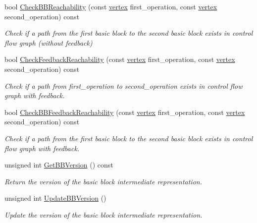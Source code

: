 \begin{DoxyCompactItemize}
bool \hyperlink{classFunctionBehavior_aa2a720e2f8f4f6d7d3240bbc13f758e9}{Check\+B\+B\+Reachability} (const \hyperlink{graph_8hpp_abefdcf0544e601805af44eca032cca14}{vertex} first\+\_\+operation, const \hyperlink{graph_8hpp_abefdcf0544e601805af44eca032cca14}{vertex} second\+\_\+operation) const
\begin{DoxyCompactList}\small\item\em Check if a path from the first basic block to the second basic block exists in control flow graph (without feedback) \end{DoxyCompactList}\item 
bool \hyperlink{classFunctionBehavior_a5aa434e53a5779c8f64fc8acdaa86bf1}{Check\+Feedback\+Reachability} (const \hyperlink{graph_8hpp_abefdcf0544e601805af44eca032cca14}{vertex} first\+\_\+operation, const \hyperlink{graph_8hpp_abefdcf0544e601805af44eca032cca14}{vertex} second\+\_\+operation) const
\begin{DoxyCompactList}\small\item\em Check if a path from first\+\_\+operation to second\+\_\+operation exists in control flow graph with feedback. \end{DoxyCompactList}\item 
bool \hyperlink{classFunctionBehavior_af24a99568892a6b7d7659302e4f7b03f}{Check\+B\+B\+Feedback\+Reachability} (const \hyperlink{graph_8hpp_abefdcf0544e601805af44eca032cca14}{vertex} first\+\_\+operation, const \hyperlink{graph_8hpp_abefdcf0544e601805af44eca032cca14}{vertex} second\+\_\+operation) const
\begin{DoxyCompactList}\small\item\em Check if a path from the first basic block to the second basic block exists in control flow graph with feedback. \end{DoxyCompactList}\item 
unsigned int \hyperlink{classFunctionBehavior_a5885c28dd9435e6ef9df8c507fbced96}{Get\+B\+B\+Version} () const
\begin{DoxyCompactList}\small\item\em Return the version of the basic block intermediate representation. \end{DoxyCompactList}\item 
unsigned int \hyperlink{classFunctionBehavior_a4e301419c7e8d6b8de50338c2d351f69}{Update\+B\+B\+Version} ()
\begin{DoxyCompactList}\small\item\em Update the version of the basic block intermediate representation. \end{DoxyCompactList}\item 

\end{DoxyCompactItemize}
